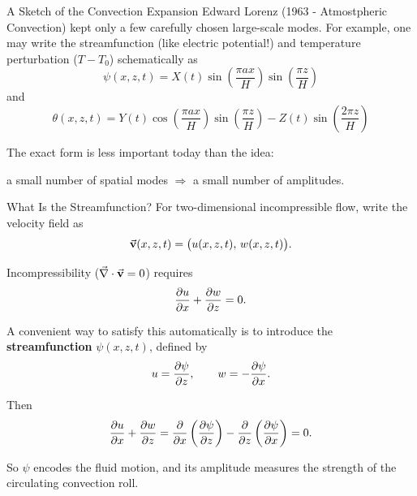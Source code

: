 \documentclass[aspectratio=169]{beamer}
\begin{document}
\begin{frame}{A Sketch of the Convection Expansion}
Edward Lorenz (1963 - Atmostpheric Convection) kept only a few carefully chosen large-scale modes.
For example, one may write the streamfunction (like electric potential!) and temperature perturbation ($T - T_0$) schematically as
\begin{equation*}
\psi(x,z,t)=X(t)\sin\!\left(\frac{\pi a x}{H}\right)\sin\!\left(\frac{\pi z}{H}\right)
\end{equation*}
and
\begin{equation*}
\theta(x,z,t)=Y(t)\cos\!\left(\frac{\pi a x}{H}\right)\sin\!\left(\frac{\pi z}{H}\right)
- Z(t)\sin\!\left(\frac{2\pi z}{H}\right)
\end{equation*}

The exact form is less important today than the idea:
\begin{center}
\large
a small number of spatial modes $\Rightarrow$ a small number of amplitudes.
\end{center}
\end{frame}

\begin{frame}{What Is the Streamfunction?}
For two-dimensional incompressible flow, write the velocity field as
\begin{equation*}
\vec{\vb{v}}(x,z,t) = \bigl(u(x,z,t),\,w(x,z,t)\bigr).
\end{equation*}

Incompressibility ($\vec{\nabla} \cdot \vec{\vb{v}} = 0$) requires
\begin{equation*}
\pdv{u}{x} + \pdv{w}{z} = 0.
\end{equation*}

A convenient way to satisfy this automatically is to introduce the
\textbf{streamfunction} $\psi(x,z,t)$, defined by
\begin{equation*}
u = \pdv{\psi}{z},
\qquad
w = -\pdv{\psi}{x}.
\end{equation*}

Then
\begin{equation*}
\pdv{u}{x} + \pdv{w}{z}
=
\pdv{}{x}\left(\pdv{\psi}{z}\right)
-
\pdv{}{z}\left(\pdv{\psi}{x}\right)
=0.
\end{equation*}

So $\psi$ encodes the fluid motion, and its amplitude measures the strength
of the circulating convection roll.
\end{frame}
\end{document}
